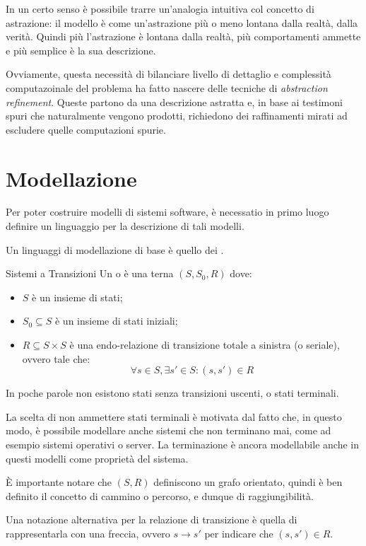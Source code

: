 In un certo senso è possibile trarre un'analogia intuitiva col concetto di astrazione: il modello è come
un'astrazione più o meno lontana dalla realtà, dalla verità. Quindi più l'astrazione
è lontana dalla realtà, più comportamenti ammette e più semplice è la sua
descrizione.

Ovviamente, questa necessità di bilanciare livello di dettaglio e complessità computazoinale del problema ha fatto nascere delle tecniche di \textit{abstraction refinement}.
Queste partono da una descrizione astratta e, in base ai testimoni spuri che naturalmente vengono prodotti, richiedono dei raffinamenti mirati ad escludere quelle computazioni spurie.

\section{Modellazione}

Per poter costruire modelli di sistemi software, è necessatio in primo luogo definire un linguaggio per la descrizione di tali modelli.

Un linguaggi di modellazione di base è quello dei .

\begin{definition}{Sistemi a Transizioni}
  Un  o  è una terna \((S,S_0,R)\) dove:
  \begin{itemize}
    \item \(S\) è un insieme di stati;
    \item \(S_0 \subseteq S\) è un insieme di stati iniziali;
    \item \(R \subseteq S \times S\) è una endo-relazione di transizione totale a sinistra (o seriale), ovvero tale che:
          \[\forall s \in S ,\exists s' \in S : (s,s') \in R\]
  \end{itemize}
  In poche parole non esistono stati senza transizioni uscenti, o stati terminali.
\end{definition}
La scelta di non ammettere stati terminali è motivata dal fatto che, in questo modo, è possibile modellare anche sistemi che non terminano mai, come ad esempio sistemi operativi o server.
La terminazione è ancora modellabile anche in questi modelli come proprietà del sistema.

È importante notare che \((S,R)\) definiscono un grafo orientato, quindi è ben definito il concetto di cammino o percorso, e dunque di raggiungibilità.

\begin{note}{}
  Una notazione alternativa per la relazione di transizione è quella di rappresentarla con una freccia, ovvero \(s \xrightarrow{} s'\) per indicare che \((s,s')\in R\).
\end{note}


